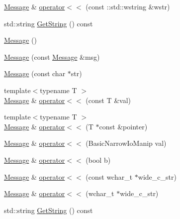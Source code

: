 \begin{DoxyCompactItemize}
\item 
\hyperlink{classtesting_1_1_message}{Message} \& \hyperlink{classtesting_1_1_message_a0feb54e52c1c27786ad67e93d4356774}{operator$<$$<$} (const \-::std\-::wstring \&wstr)
\item 
std\-::string \hyperlink{classtesting_1_1_message_abe8c1b7584aa670dd0e2413e8317a937}{Get\-String} () const 
\item 
\hyperlink{classtesting_1_1_message_af5ba7216630df9845f18feb64b1a5383}{Message} ()
\item 
\hyperlink{classtesting_1_1_message_ac126e24804817a053bebba0920d94a11}{Message} (const \hyperlink{classtesting_1_1_message}{Message} \&msg)
\item 
\hyperlink{classtesting_1_1_message_a9de694ca239486809fc99fbbea8ac21d}{Message} (const char $\ast$str)
\item 
{\footnotesize template$<$typename T $>$ }\\\hyperlink{classtesting_1_1_message}{Message} \& \hyperlink{classtesting_1_1_message_a2e0e71be52d54c20a75a55fca812721f}{operator$<$$<$} (const T \&val)
\item 
{\footnotesize template$<$typename T $>$ }\\\hyperlink{classtesting_1_1_message}{Message} \& \hyperlink{classtesting_1_1_message_aa3ab685879958f90d2d8cd5b68d10c34}{operator$<$$<$} (T $\ast$const \&pointer)
\item 
\hyperlink{classtesting_1_1_message}{Message} \& \hyperlink{classtesting_1_1_message_a3a71a1c1c8ea52de5852d75483d41453}{operator$<$$<$} (Basic\-Narrow\-Io\-Manip val)
\item 
\hyperlink{classtesting_1_1_message}{Message} \& \hyperlink{classtesting_1_1_message_a3e1e04f23b1bdfe18adfd59928296346}{operator$<$$<$} (bool b)
\item 
\hyperlink{classtesting_1_1_message}{Message} \& \hyperlink{classtesting_1_1_message_a34774e225944cb6df02db9689d312aae}{operator$<$$<$} (const wchar\-\_\-t $\ast$wide\-\_\-c\-\_\-str)
\item 
\hyperlink{classtesting_1_1_message}{Message} \& \hyperlink{classtesting_1_1_message_aae57eefb3a72a19c11453d630b1d846c}{operator$<$$<$} (wchar\-\_\-t $\ast$wide\-\_\-c\-\_\-str)
\item 
std\-::string \hyperlink{classtesting_1_1_message_abe8c1b7584aa670dd0e2413e8317a937}{Get\-String} () const 
\end{DoxyCompactItemize}



